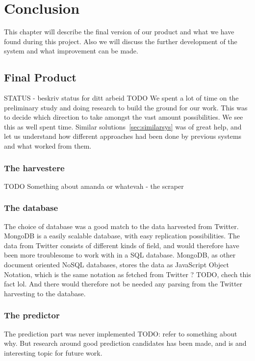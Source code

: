 
\chapter{Conclusion}

\minitoc

This chapter will describe the final version of our product and what we have found during this project. Also we will discuss the further development of the system and what improvement can be made.

\clearpage

\section{Final Product}
STATUS - beskriv status for ditt arbeid
TODO
We spent a lot of time on the preliminary study and doing research to build the ground for our work. This was to decide which direction to take amongst the vast amount possibilities. We see this as well spent time. Similar solutions~\ref{sec:similarsys} was of great help, and let us understand how different approaches had been done by previous systems and what worked from them.

\subsection{The harvestere}
TODO Something about amanda or whatevah - the scraper

\subsection{The database}
The choice of database was a good match to the data harvested from Twitter. MongoDB is a easily scalable database, with easy replication possibilities. The data from Twitter consists of different kinds of field, and would therefore have been more troublesome to work with in a SQL database. MongoDB, as other document oriented NoSQL databases, stores the data as JavaScript Object Notation, which is the same notation as fetched from Twitter ? TODO, chech this fact lol. And there would therefore not be needed any parsing from the Twitter harvesting to the database.

\subsection{The predictor}
The prediction part was never implemented TODO: refer to something about why. But research around good prediction candidates has been made, and is and interesting topic for future work.


